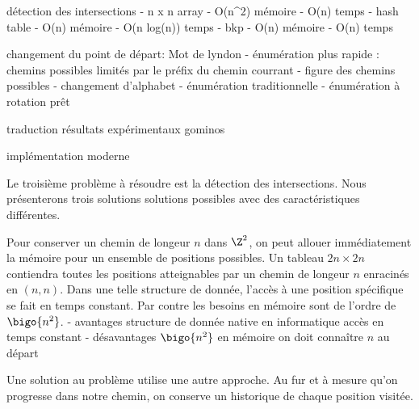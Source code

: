 détection des intersections
	- n x n array
		- O(n^2) mémoire
		- O(n) temps
	- hash table
		- O(n) mémoire
		- O(n log(n)) temps
	- bkp
		- O(n) mémoire
		- O(n) temps

changement du point de départ: Mot de lyndon
	- énumération plus rapide : chemins possibles limités par le préfix du chemin courrant
		- figure des chemins possibles
	- changement d'alphabet
		- énumération traditionnelle
		- énumération à rotation prêt
		
traduction résultats expérimentaux gominos

implémentation moderne


Le troisième problème à résoudre est la détection des intersections. Nous présenterons trois solutions solutions possibles avec des caractéristiques différentes.

Pour conserver un chemin de longeur $n$ dans $\Z^2$, on peut  allouer immédiatement la mémoire pour un ensemble de positions possibles. Un tableau $2n \times 2n$ contiendra toutes les positions atteignables par un chemin de longeur $n$ enracinés en $(n,n)$. Dans une telle structure de donnée, l'accès à une position spécifique se fait en temps constant. Par contre les besoins en mémoire sont  de l'ordre de $\bigo{n^2}$. 
- avantages
	structure de donnée native en informatique
	accès en temps constant
- désavantages
	$\bigo{n^2}$ en mémoire 
	on doit connaître $n$ au départ


Une solution au problème utilise une autre approche. Au fur et à mesure qu'on progresse dans notre chemin, on conserve un historique de chaque position visitée.